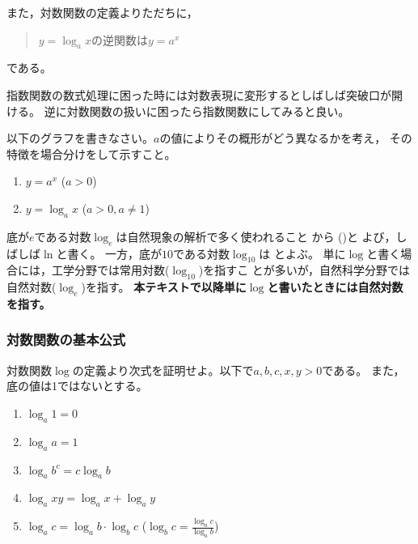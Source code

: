 \documentclass[twocolumn,11pt]{jarticle}
\begin{document}
また，対数関数の定義よりただちに，
\begin{quote}
  $y=\log_a x$の逆関数は$y=a^x$
\end{quote}
である。

指数関数の数式処理に困った時には対数表現に変形するとしばしば突破口が開
ける。
逆に対数関数の扱いに困ったら指数関数にしてみると良い。

\nquestion
以下のグラフを書きなさい。$a$の値によりその概形がどう異なるかを考え，
その特徴を場合分けをして示すこと。
\begin{enumerate}
\item $y=a^x$ ($a>0$)
\item $y=\log_ax$ ($a>0,a\ne 1$)
\end{enumerate}

\comment
底が$e$である対数$\log_e$は自然現象の解析で多く使われること
から ()と
よび，しばしば$\ln$\index{$\ln$}と書く。
一方，底が$10$である対数$\log_{10}$は
とよぶ。
単に$\log$と書く場合には，工学分野では常用対数($\log_{10}$)を指すこ
とが多いが，自然科学分野では自然対数($\log_e$)を指す。
\textbf{本テキストで以降単に$\log$と書いたときには自然対数を指す。}


\subsubsection{対数関数の基本公式}

\nquestion
対数関数$\log$の定義より次式を証明せよ。以下で$a,b,c,x,y>0$である。
また，底の値は1ではないとする。
\begin{enumerate}
\item $\log_a 1=0$
\item $\log_a a=1$
\item $\log_a b^c=c\log_a b$
\item $\log_a xy=\log_a x+ \log_a y$
\item $\displaystyle\log_a c=\log_a b\cdot\log_b c$\quad
($\displaystyle\log_b c=\frac{\log_a c}{\log_a b}$)
\end{enumerate}
\end{document}
